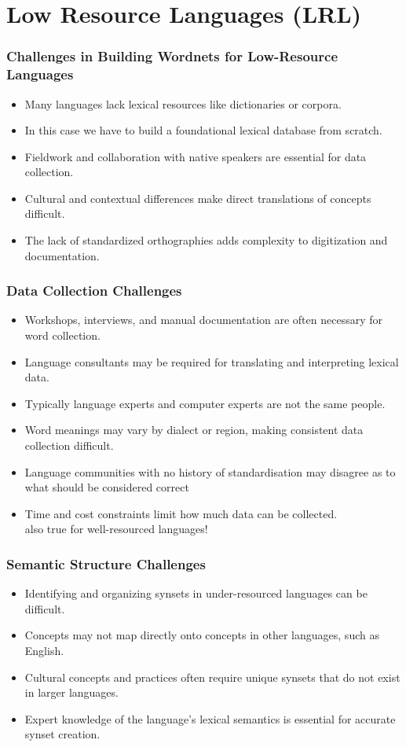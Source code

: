 \documentclass[xetex]{beamer}  %
\begin{document}
\section{Low Resource Languages (LRL)}

\begin{frame}
\frametitle{Challenges in Building Wordnets for Low-Resource Languages}

\begin{itemize}
    \item Many languages lack  lexical resources like dictionaries or corpora.
    \item In this case we have to build a foundational lexical database from scratch.
    \item Fieldwork and collaboration with native speakers are essential for data collection.
    \item Cultural and contextual differences make direct translations of concepts difficult.
    \item The lack of standardized orthographies adds complexity to digitization and documentation.
\end{itemize}
\end{frame}

\begin{frame}
\frametitle{Data Collection Challenges}

\begin{itemize}
    \item Workshops, interviews, and manual documentation are often necessary for word collection.
    \item Language consultants may be required for translating and interpreting lexical data.
    \item Typically language experts and computer experts are not the same people.
    \item Word meanings may vary by dialect or region, making consistent data collection difficult.
    \item Language communities with no history of standardisation may disagree as to what should be considered correct
    \item Time and cost constraints limit how much data can be collected.
      \\ also true for well-resourced languages!
\end{itemize}
\end{frame}

\begin{frame}
\frametitle{Semantic Structure Challenges}

\begin{itemize}
    \item Identifying and organizing synsets in under-resourced languages can be difficult.
    \item Concepts may not map directly onto concepts in other languages, such as English.
    \item Cultural concepts and practices often require unique synsets that do not exist in larger languages.
    \item Expert knowledge of the language's lexical semantics is essential for accurate synset creation.
\end{itemize}
\end{frame}
\end{document}
